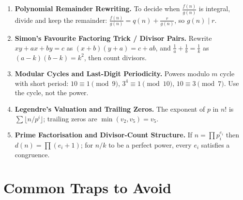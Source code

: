 \documentclass[11pt,a4paper]{article}
\begin{document}
\begin{enumerate}[leftmargin=2em, itemsep=4pt]
  \item \textbf{Polynomial Remainder Rewriting.}
        To decide when $\frac{f(n)}{g(n)}$ is integral, divide and keep the remainder: $\frac{f(n)}{g(n)} = q(n) + \frac{r}{g(n)}$, so $g(n)\mid r$. 
  \item \textbf{Simon's Favourite Factoring Trick / Divisor Pairs.}
        Rewrite $xy + ax + by = c$ as $(x+b)(y+a)=c+ab$, and $\frac1a+\frac1b=\frac1k$ as $(a-k)(b-k)=k^{2}$, then count divisors. 
  \item \textbf{Modular Cycles and Last-Digit Periodicity.}
        Powers modulo $m$ cycle with short period: $10\equiv1\pmod9$, $3^{4}\equiv1\pmod{10}$, $10\equiv3\pmod7$. Use the cycle, not the power. 
  \item \textbf{Legendre's Valuation and Trailing Zeros.}
        The exponent of $p$ in $n!$ is $\sum\lfloor n/p^{i}\rfloor$; trailing zeros are $\min(v_{2},v_{5})=v_{5}$. 
  \item \textbf{Prime Factorisation and Divisor-Count Structure.}
        If $n=\prod p_{i}^{e_{i}}$ then $d(n)=\prod(e_{i}+1)$; for $n/k$ to be a perfect power, every $e_{i}$ satisfies a congruence. 
\end{enumerate}

\section*{Common Traps to Avoid}
\end{document}
